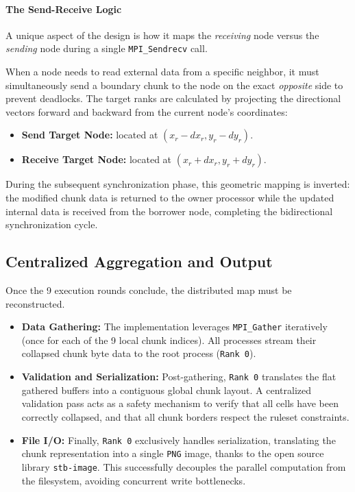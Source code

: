 \paragraph{The Send-Receive Logic}
A unique aspect of the design is how it maps the \textit{receiving} node versus the \textit{sending} node during a single \texttt{MPI\_Sendrecv} call. 

When a node needs to read external data from a specific neighbor, it must simultaneously send a boundary chunk to the node on the exact \textit{opposite} side to prevent deadlocks. The target ranks are calculated by projecting the directional vectors forward and backward from the current node's coordinates:
\begin{itemize}
    \item \textbf{Send Target Node:} located at $(x_r - dx_r, y_r - dy_r)$.
    \item \textbf{Receive Target Node:} located at $(x_r + dx_r, y_r + dy_r)$.
\end{itemize}

During the subsequent synchronization phase, this geometric mapping is inverted: the modified chunk data is returned to the owner processor while the updated internal data is received from the borrower node, completing the bidirectional synchronization cycle.

\subsection{Centralized Aggregation and Output}
Once the 9 execution rounds conclude, the distributed map must be reconstructed.

\begin{itemize}
    \item \textbf{Data Gathering:} The implementation leverages \texttt{MPI\_Gather} iteratively (once for each of the 9 local chunk indices). All processes stream their collapsed chunk byte data to the root process (\texttt{Rank 0}).
    
    \item \textbf{Validation and Serialization:} Post-gathering, \texttt{Rank 0} translates the flat gathered buffers into a contiguous global chunk layout. A centralized validation pass acts as a safety mechanism to verify that all cells have been correctly collapsed, and that all chunk borders respect the ruleset constraints. 

    \item \textbf{File I/O:} Finally, \texttt{Rank 0} exclusively handles serialization, translating the chunk representation into a single \texttt{PNG} image, thanks to the open source library \texttt{stb-image}\cite{stbimage}. This successfully decouples the parallel computation from the filesystem, avoiding concurrent write bottlenecks.
\end{itemize}



